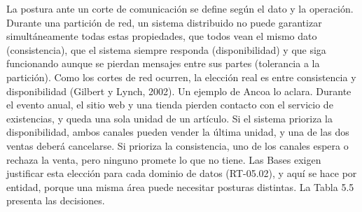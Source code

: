 \documentclass[11pt]{article}
\begin{document}
La postura ante un corte de comunicación se define según el dato y la operación. Durante una partición de red, un sistema distribuido no puede garantizar simultáneamente todas estas propiedades, que todos vean el mismo dato (consistencia), que el sistema siempre responda (disponibilidad) y que siga funcionando aunque se pierdan mensajes entre sus partes (tolerancia a la partición). Como los cortes de red ocurren, la elección real es entre consistencia y disponibilidad (Gilbert y Lynch, 2002). Un ejemplo de Ancoa lo aclara. Durante el evento anual, el sitio web y una tienda pierden contacto con el servicio de existencias, y queda una sola unidad de un artículo. Si el sistema prioriza la disponibilidad, ambos canales pueden vender la última unidad, y una de las dos ventas deberá cancelarse. Si prioriza la consistencia, uno de los canales espera o rechaza la venta, pero ninguno promete lo que no tiene. Las Bases exigen justificar esta elección para cada dominio de datos (RT-05.02), y aquí se hace por entidad, porque una misma área puede necesitar posturas distintas. La Tabla 5.5 presenta las decisiones.

\par\vspace{0pt plus 58\baselineskip}\vspace{0pt plus -58\baselineskip}
\end{document}
